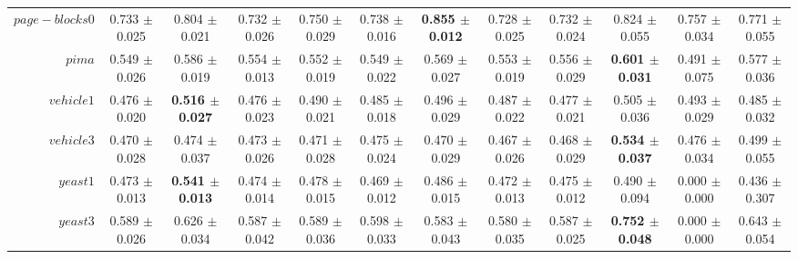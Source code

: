 \begin{table}[!ht]
{\begin{tabular}{r c c c c c c c c c c c}
$page-blocks0$ & 0.733 $\pm$ 0.025 & 0.804 $\pm$ 0.021 & 0.732 $\pm$ 0.026 & 0.750 $\pm$ 0.029 & 0.738 $\pm$ 0.016 & \textbf{0.855 $\pm$ 0.012} & 0.728 $\pm$ 0.025 & 0.732 $\pm$ 0.024 & 0.824 $\pm$ 0.055 & 0.757 $\pm$ 0.034 & 0.771 $\pm$ 0.055 \\
$pima$ & 0.549 $\pm$ 0.026 & 0.586 $\pm$ 0.019 & 0.554 $\pm$ 0.013 & 0.552 $\pm$ 0.019 & 0.549 $\pm$ 0.022 & 0.569 $\pm$ 0.027 & 0.553 $\pm$ 0.019 & 0.556 $\pm$ 0.029 & \textbf{0.601 $\pm$ 0.031} & 0.491 $\pm$ 0.075 & 0.577 $\pm$ 0.036 \\
$vehicle1$ & 0.476 $\pm$ 0.020 & \textbf{0.516 $\pm$ 0.027} & 0.476 $\pm$ 0.023 & 0.490 $\pm$ 0.021 & 0.485 $\pm$ 0.018 & 0.496 $\pm$ 0.029 & 0.487 $\pm$ 0.022 & 0.477 $\pm$ 0.021 & 0.505 $\pm$ 0.036 & 0.493 $\pm$ 0.029 & 0.485 $\pm$ 0.032 \\
$vehicle3$ & 0.470 $\pm$ 0.028 & 0.474 $\pm$ 0.037 & 0.473 $\pm$ 0.026 & 0.471 $\pm$ 0.028 & 0.475 $\pm$ 0.024 & 0.470 $\pm$ 0.029 & 0.467 $\pm$ 0.026 & 0.468 $\pm$ 0.029 & \textbf{0.534 $\pm$ 0.037} & 0.476 $\pm$ 0.034 & 0.499 $\pm$ 0.055 \\
$yeast1$ & 0.473 $\pm$ 0.013 & \textbf{0.541 $\pm$ 0.013} & 0.474 $\pm$ 0.014 & 0.478 $\pm$ 0.015 & 0.469 $\pm$ 0.012 & 0.486 $\pm$ 0.015 & 0.472 $\pm$ 0.013 & 0.475 $\pm$ 0.012 & 0.490 $\pm$ 0.094 & 0.000 $\pm$ 0.000 & 0.436 $\pm$ 0.307 \\
$yeast3$ & 0.589 $\pm$ 0.026 & 0.626 $\pm$ 0.034 & 0.587 $\pm$ 0.042 & 0.589 $\pm$ 0.036 & 0.598 $\pm$ 0.033 & 0.583 $\pm$ 0.043 & 0.580 $\pm$ 0.035 & 0.587 $\pm$ 0.025 & \textbf{0.752 $\pm$ 0.048} & 0.000 $\pm$ 0.000 & 0.643 $\pm$ 0.054 \\
\end{tabular}}
\end{table}

